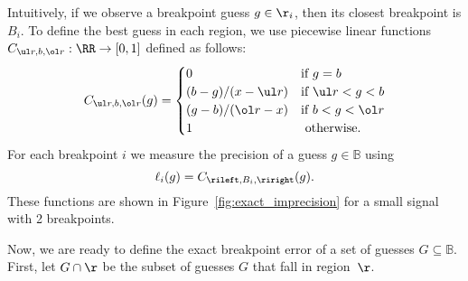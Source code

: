 \documentclass{article}
\begin{document}
Intuitively, if we observe a breakpoint guess $g\in \r_i$, then its
closest breakpoint is $B_i$. To define the best guess in each region,
we use piecewise linear functions $C_{\ul r,b,\ol r}:\RR\rightarrow[0,1]$
defined as follows:
\begin{equation}
  \label{eq:cLxR}
  C_{\ul r,b,\ol r}(g) =
  \begin{cases}
    0 & \text{if }g=b \\
    (b-g)/(x-\ul r) & \text{if } \ul r< g< b \\
    (g-b)/(\ol r-x) & \text{if } b< g< \ol r\\
    1 & \text{ otherwise}.
  \end{cases}
\end{equation}
For each breakpoint $i$ we measure the precision of a guess
$g\in\mathbb B$ using
\begin{equation}
  \label{eq:ell_i_exact}
  \ell_i(g)=C_{\rileft,B_i,\riright}(g).
\end{equation}
These functions are shown in Figure~\ref{fig:exact_imprecision} for a
small signal with 2 breakpoints.

Now, we are ready to define the exact breakpoint error of a set of
guesses $G\subseteq\mathbb B$.
First, let $G \cap\r$ be the subset of guesses $G$ that fall in
region~$\r$. 
\end{document}
